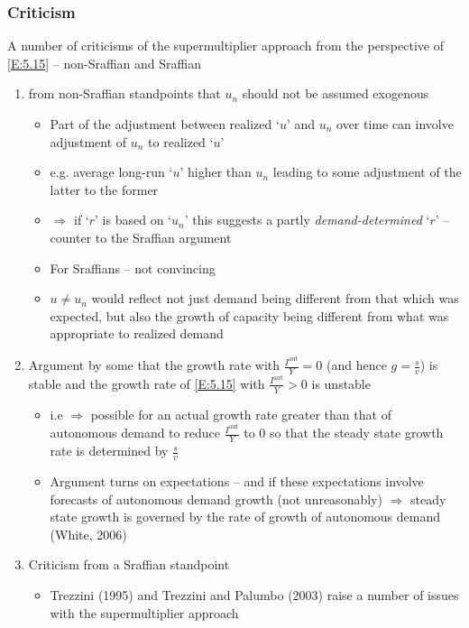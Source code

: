 \documentclass{article}
\begin{document}
\subsubsection{Criticism}
	A number of criticisms of the supermultiplier approach from the perspective of \cref{E:5.15} -- non-Sraffian and Sraffian
	\begin{enumerate}
		\item from non-Sraffian standpoints that \( u_n \) should not be assumed exogenous
		\begin{itemize}
			\item Part of the adjustment between realized `\( u \)' and \( u_n \) over time can involve adjustment of \( u_n \) to realized `\( u \)'
			\item e.g. average long-run `\( u \)' higher than \( u_n \) leading to some adjustment of the latter to the former
			\item \( \Rightarrow \) if `\( r \)' is based on `\( u_n \)' this suggests a partly \textit{demand-determined} `\( r \)' -- counter to the Sraffian argument
			\item For Sraffians -- not convincing
			\item \( u \neq u_n \) would reflect not just demand being different from that which was expected, but also the growth of capacity being different from what was appropriate to realized demand
		\end{itemize}
		\item Argument by some that the growth rate with \( \frac{I^\text{aut}}{Y} = 0 \) (and hence \( g = \frac{s}{v} \)) is stable and the growth rate of \cref{E:5.15} with \( \frac{I^\text{aut}}{Y} > 0 \) is unstable
		\begin{itemize}
			\item i.e \( \Rightarrow \) possible for an actual growth rate greater than that of autonomous demand to reduce \( \frac{I^\text{aut}}{Y} \) to 0 so that the steady state growth rate is determined by \( \frac{s}{v} \)
			\item Argument turns on expectations -- and if these expectations involve forecasts of autonomous demand growth (not unreasonably) \( \Rightarrow \) steady state growth is governed by the rate of growth of autonomous demand (White, 2006)
		\end{itemize}
		\item Criticism from a Sraffian standpoint
		\begin{itemize}
			\item Trezzini (1995) and Trezzini and Palumbo (2003) raise a number of issues with the supermultiplier approach

\end{itemize}
\end{enumerate}
\end{document}
